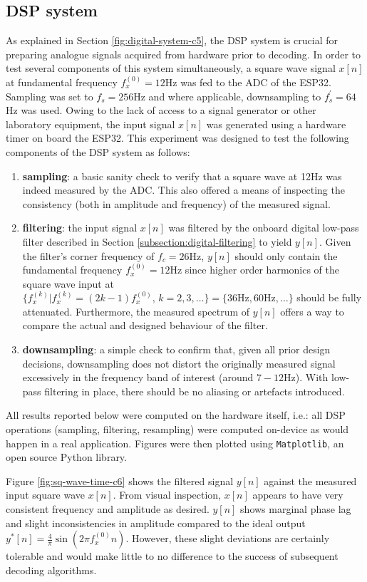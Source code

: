 \subsection{DSP system}
As explained in Section \ref{fig:digital-system-c5}, the DSP system is crucial for preparing analogue signals acquired from hardware prior to decoding. In order to test several components of this system simultaneously, a square wave signal $x[n]$ at fundamental frequency $f_x^{(0)}=12$Hz was fed to the ADC of the ESP32. Sampling was set to $f_s=256$Hz and where applicable, downsampling to $f_s^'=64$Hz was used. Owing to the lack of access to a signal generator or other laboratory equipment, the input signal $x[n]$ was generated using a hardware timer on board the ESP32. This experiment was designed to test the following components of the DSP system as follows:
\begin{enumerate}
    \item \textbf{sampling}: a basic sanity check to verify that a square wave at 12Hz was indeed measured by the ADC. This also offered a means of inspecting the consistency (both in amplitude and frequency) of the measured signal.
    \item \textbf{filtering}: the input signal $x[n]$ was filtered by the onboard digital low-pass filter described in Section \ref{subsection:digital-filtering} to yield $y[n]$. Given the filter's corner frequency of $f_c=26$Hz, $y[n]$ should only contain the fundamental frequency $f_x^{(0)}=12$Hz since higher order harmonics of the square wave input at $\{f_x^{(k)} |f_x^{(k)}=(2k-1)f_x^{(0)}, \, k=2,3, \dots\} = \{36\text{Hz}, 60\text{Hz}, \dots\}$ should be fully attenuated. Furthermore, the measured spectrum of $y[n]$ offers a way to compare the actual and designed behaviour of the filter.
    \item \textbf{downsampling}: a simple check to confirm that, given all prior design decisions, downsampling does not distort the originally measured signal excessively in the frequency band of interest (around $7-12$Hz). With low-pass filtering in place, there should be no aliasing or artefacts introduced.
\end{enumerate}

All results reported below were computed on the hardware itself, i.e.: all DSP operations (sampling, filtering, resampling) were computed on-device as would happen in a real application. Figures were then plotted using \texttt{Matplotlib}, an open source Python library.

Figure \ref{fig:sq-wave-time-c6} shows the filtered signal $y[n]$ against the measured input square wave $x[n]$. From visual inspection, $x[n]$ appears to have very consistent frequency and amplitude as desired. $y[n]$ shows marginal phase lag and slight inconsistencies in amplitude compared to the ideal output $y^*[n] = \frac{4}{\pi}\sin(2\pi f_x^{(0)}n)$. However, these slight deviations are certainly tolerable and would make little to no difference to the success of subsequent decoding algorithms.


